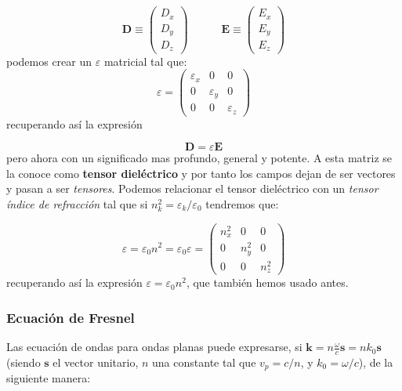 \documentclass[12pt]{article}
\newcommand{\tquad}{\quad \quad \quad}
\newcommand{\En}{\mathbf{E}}
\newcommand{\Dn}{\mathbf{D}}
\newcommand{\kn}{\mathbf{k}}
\newcommand{\sn}{\mathbf{s}}
\numberwithin{equation}{section}
\numberwithin{figure}{section}
\begin{document}
\begin{equation}
\Dn \equiv \begin{pmatrix}
D_x \\
D_y  \\
D_z 
\end{pmatrix} \tquad \En \equiv \begin{pmatrix}
E_x \\
E_y \\
E_z
\end{pmatrix} 
\end{equation}
podemos crear un $\varepsilon$ matricial tal que:
\begin{equation}
\varepsilon = \begin{pmatrix}
\varepsilon_x & 0 & 0 \\
0 & \varepsilon_y & 0 \\
0 & 0 & \varepsilon_z 
\end{pmatrix}
\end{equation}
recuperando así la expresión 


\begin{equation}
\Dn = \varepsilon \En
\end{equation}
pero ahora con un significado mas profundo, general y potente. A esta matriz se la conoce como \textbf{tensor dieléctrico} y por tanto los campos dejan de ser vectores y pasan a ser \textit{tensores}. Podemos relacionar el tensor dieléctrico con un \textit{tensor índice de refracción} tal que si $n_k^2 = \varepsilon_k / \varepsilon_0$ tendremos que:


\begin{equation}
\varepsilon = \varepsilon_0 n^2 = \varepsilon_0 
\varepsilon = \begin{pmatrix}
n_x^2 & 0 & 0 \\
0 & n^2_y & 0 \\
0 & 0 & n^2_z 
\end{pmatrix}
\end{equation}
recuperando así la expresión $\varepsilon=\varepsilon_0 n^2$, que también hemos usado antes.



\subsubsection{Ecuación de Fresnel}

Las ecuación de ondas para ondas planas puede expresarse, si $\kn = n \frac{\omega}{c} \sn = n k_0 \sn$ (siendo $\sn$ el vector unitario, $n$ una constante tal que $v_p = c /n$, y $k_0 = \omega /c$), de la siguiente manera:
\end{document}
